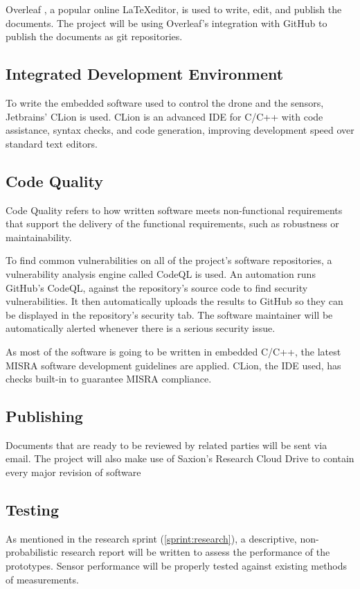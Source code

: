 \documentclass[11pt, a4paper]{article}
\begin{document}
Overleaf \cite{overleaf}, a popular online \LaTeX editor, is used to write, edit, and publish the documents. The project will be using Overleaf's integration with GitHub to publish the documents as git repositories.

\subsection{Integrated Development Environment}
To write the embedded software used to control the drone and the sensors, Jetbrains' CLion \cite{clion} is used. CLion is an advanced IDE for C/C++ with code assistance, syntax checks, and code generation, improving development speed over standard text editors.

\subsection{Code Quality}
Code Quality refers to how written software meets non-functional requirements that support the delivery of the functional requirements, such as robustness or maintainability. 

To find common vulnerabilities on all of the project's software repositories, a vulnerability analysis engine called CodeQL is used. An automation \cite{codeql} runs GitHub's CodeQL, against the repository's source code to find security vulnerabilities. It then automatically uploads the results to GitHub so they can be displayed in the repository's security tab. The software maintainer will be automatically alerted whenever there is a serious security issue.

As most of the software is going to be written in embedded C/C++, the latest MISRA  software development guidelines \cite{misra} are applied. CLion, the IDE used, has checks built-in to guarantee MISRA compliance. \cite{clion:misra}

\subsection{Publishing}
Documents that are ready to be reviewed by related parties will be sent via email. The project will also make use of Saxion's Research Cloud Drive to contain every major revision of software

\subsection{Testing}
As mentioned in the research sprint (\ref{sprint:research}), a descriptive, non-probabilistic research report will be written to assess the performance of the prototypes. Sensor performance will be properly tested against existing methods of measurements.
\end{document}
